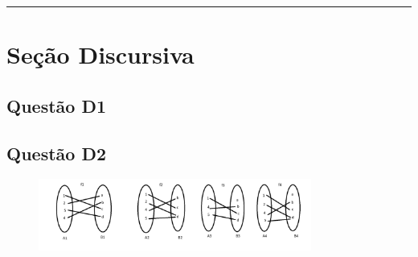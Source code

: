 \documentclass{article}
\begin{document}
\vspace{0.5em}
\hrule
\vspace{0.5em}

\section{Seção Discursiva}

\subsection{Questão D1}
\subsection{Questão D2}
\begin{figure}[h]
    \centering
    \includegraphics[width=0.8\textwidth]{qd2.png} 
    \label{fig:questaoD2}
\end{figure}
\end{document}
